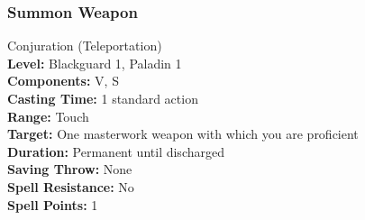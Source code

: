 % 
% 
% 
\subsubsection{Summon Weapon}
\label{Spell:SummonWeapon}
Conjuration (Teleportation)
\\ \textbf{Level:} Blackguard 1, Paladin 1
\\ \textbf{Components:} V, S
\\ \textbf{Casting Time:} 1 standard action
\\ \textbf{Range:} Touch
\\ \textbf{Target:} One masterwork weapon with which you are proficient
\\ \textbf{Duration:} Permanent until discharged
\\ \textbf{Saving Throw:} None
\\ \textbf{Spell Resistance:} No
\\ \textbf{Spell Points:} 1


